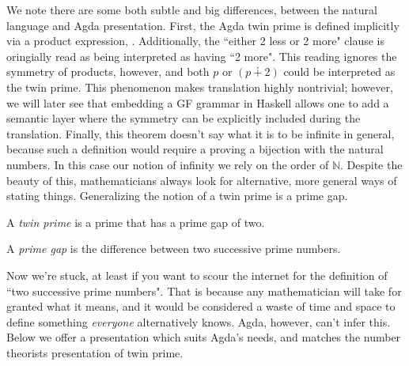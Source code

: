 We note there are some both subtle and big differences, between the natural
language and Agda presentation. First, the Agda twin prime is defined implicitly
via a product expression, . Additionally, the ``either 2 less or 2 more"
clause is oringially read as being interpreted as having ``2 more". This reading
ignores the symmetry of products, however, and both $p$ or $(p ∔ 2)$ could be
interpreted as the twin prime. This phenomenon makes translation highly
nontrivial; however, we will later see that embedding a GF grammar in Haskell
allows one to add a semantic layer where the symmetry can be explicitly included
during the translation. Finally, this theorem doesn't say what it is to be
infinite in general, because such a definition would require a proving a
bijection with the natural numbers. In this case our notion of infinity we rely
on the order of $ℕ$. Despite the beauty of this, mathematicians always look for
alternative, more general ways of stating things. Generalizing the notion of a
twin prime is a prime gap.

\begin{definition}\label{def:def11}
A \emph{twin prime} is a prime that has a prime gap of two.
\end{definition}
\begin{definition}\label{def:def12}
A \emph{prime gap} is the difference between two successive prime numbers.
\end{definition}

Now we're stuck, at least if you want to scour the internet for the definition
of ``two successive prime numbers". That is because any mathematician will take
for granted what it means, and it would be considered a waste of time and space
to define something \emph{everyone} alternatively knows. Agda, however, can't
infer this. Below we offer a presentation which suits Agda's needs, and matches
the number theorists presentation of twin prime.

